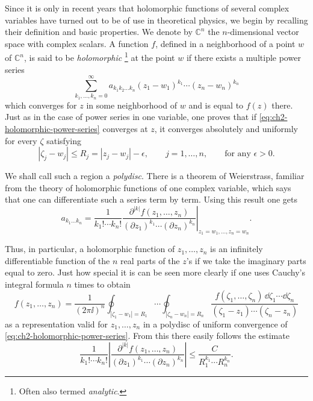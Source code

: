 Since it is only in recent years that holomorphic functions of several
complex variables have turned out to be of use in theoretical physics, we
begin by recalling their definition and basic properties.  We denote by
$\mathbb{C}^n$ the $n$-dimensional vector space with complex scalars.  A
function $f$, defined in a neighborhood of a point $w$ of $\mathbb{C}^n$,
 is said to be \emph{holomorphic}\begingroup
 \renewcommand{\thefootnote}{\ensuremath{\dagger}}
 \footnote{Often also termed \emph{analytic}.}
 \endgroup
at the point $w$ if there exists a multiple power series
\begin{equation}
  \sum_{k_1,\ldots,k_n=0}^{\infty}
  a_{k_1 k_2\ldots k_n}(z_1-w_1)^{k_1}\cdots
  (z_n-w_n)^{k_n}
  \tag{2-55}\label{eq:ch2-holomorphic-power-series}
\end{equation}
which converges for $z$ in some neighborhood of $w$ and is equal to
$f(z)$ there.  Just as in the case of power series in one variable, one
proves that if \eqref{eq:ch2-holomorphic-power-series} converges at $z$, it converges absolutely and
uniformly for every $\zeta$ satisfying
\begin{equation}
  |\zeta_j-w_j|\leq R_j=|z_j-w_j|-\epsilon,
  \qquad j=1,\ldots,n,\qquad\text{for any }\epsilon>0.
  \tag{2-56}\label{eq:ch2-polydisc-radii}
\end{equation}

We shall call such a region a \emph{polydisc}.  There is a theorem of
Weierstrass, familiar from the theory of holomorphic functions of one
complex variable, which says that one can differentiate such a series term
by term.  Using this result one gets
\begin{equation}
  a_{k_1\ldots k_n}
  =\frac{1}{k_1!\cdots k_n!}
  \left.\frac{\partial^{|k|}f(z_1,\ldots,z_n)}
  {(\partial z_1)^{k_1}\cdots(\partial z_n)^{k_n}}
  \right|_{z_1=w_1,\ldots,z_n=w_n} .
  \tag{2-57}\label{eq:ch2-holomorphic-coefficients}
\end{equation}

Thus, in particular, a holomorphic function of $z_1,\ldots,z_n$ is an
infinitely differentiable function of the $n$ real parts of the $z$'s if we
take the imaginary parts equal to zero.  Just how special it is can be seen
more clearly if one uses Cauchy's integral formula $n$ times to obtain
\begin{equation}
  f(z_1,\ldots,z_n)=\frac{1}{(2\pi \ii)^n}
  \oint_{|\zeta_1-w_1|=R_1}\!\cdots\!\oint_{|\zeta_n-w_n|=R_n}
  \frac{f(\zeta_1,\ldots,\zeta_n)\,\dd\zeta_1\cdots \dd\zeta_n}
  {(\zeta_1-z_1)\cdots(\zeta_n-z_n)}
  \tag{2-58}\label{eq:ch2-cauchy-polydisc}
\end{equation}
as a representation valid for $z_1,\ldots,z_n$ in a polydisc of uniform
convergence of \eqref{eq:ch2-holomorphic-power-series}.  From this there easily follows the estimate
\begin{equation}
  \frac{1}{k_1!\cdots k_n!}
  \left|\frac{\partial^{|k|}f(z_1,\ldots,z_n)}
  {(\partial z_1)^{k_1}\cdots(\partial z_n)^{k_n}}\right|
  \leq\frac{C}{R_1^{k_1}\cdots R_n^{k_n}} .
  \tag{2-59}\label{eq:ch2-cauchy-estimate}
\end{equation}

